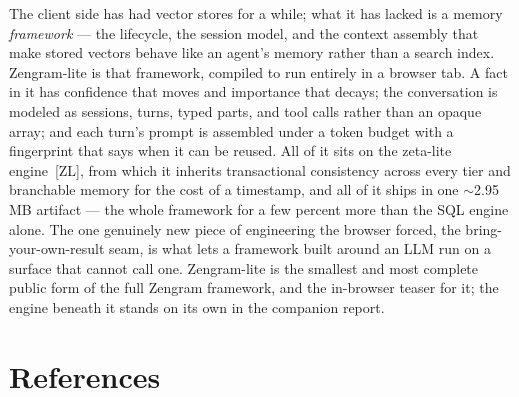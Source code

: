 \documentclass[11pt]{article}
\begin{document}
The client side has had vector stores for a while; what it has lacked is a memory
\emph{framework} --- the lifecycle, the session model, and the context assembly
that make stored vectors behave like an agent's memory rather than a search index.
Zengram-lite is that framework, compiled to run entirely in a browser tab. A fact
in it has confidence that moves and importance that decays; the conversation is
modeled as sessions, turns, typed parts, and tool calls rather than an opaque
array; and each turn's prompt is assembled under a token budget with a fingerprint
that says when it can be reused. All of it sits on the zeta-lite engine~[ZL], from
which it inherits transactional consistency across every tier and branchable memory
for the cost of a timestamp, and all of it ships in one $\sim$2.95\,MB artifact ---
the whole framework for a few percent more than the SQL engine alone. The one
genuinely new piece of engineering the browser forced, the bring-your-own-result
seam, is what lets a framework built around an LLM run on a surface that cannot call
one. Zengram-lite is the smallest and most complete public form of the full
Zengram framework, and the in-browser teaser for it; the engine beneath it stands
on its own in the companion report.

\section*{References}
\end{document}
